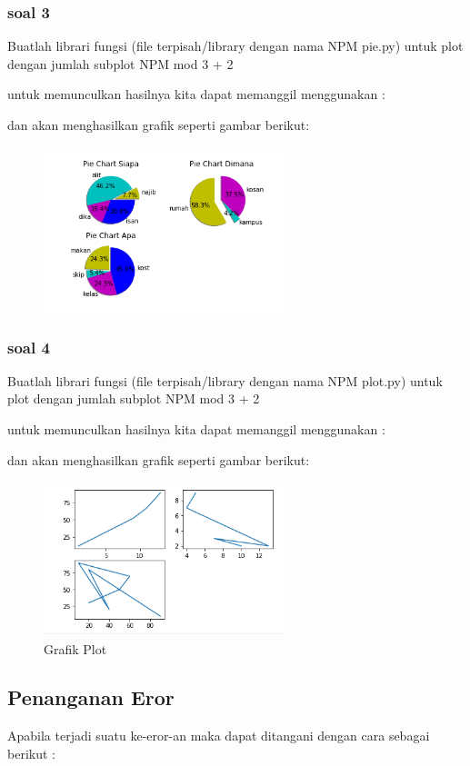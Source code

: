 \subsubsection{soal 3}
Buatlah librari fungsi (ﬁle terpisah/library dengan nama NPM pie.py) untuk plot dengan jumlah subplot NPM mod 3 + 2

untuk memunculkan hasilnya kita dapat memanggil menggunakan :


dan akan menghasilkan grafik seperti gambar berikut:
\begin{figure}[H]
\centering
\includegraphics[width=7cm]{figures/chapter6/1174063/p3.png}
\label{GAbe}
\end{figure}


\subsubsection{soal 4}
Buatlah librari fungsi (ﬁle terpisah/library dengan nama NPM plot.py) untuk plot dengan jumlah subplot NPM mod 3 + 2

untuk memunculkan hasilnya kita dapat memanggil menggunakan :


dan akan menghasilkan grafik seperti gambar berikut:
\begin{figure}[H]
\centering
\includegraphics[width=7cm]{figures/chapter6/1174063/p4.png}
\caption{Grafik Plot}
\label{Gabe}
\end{figure}

\subsection{Penanganan Eror}
Apabila terjadi suatu ke-eror-an maka dapat ditangani dengan cara sebagai berikut :
